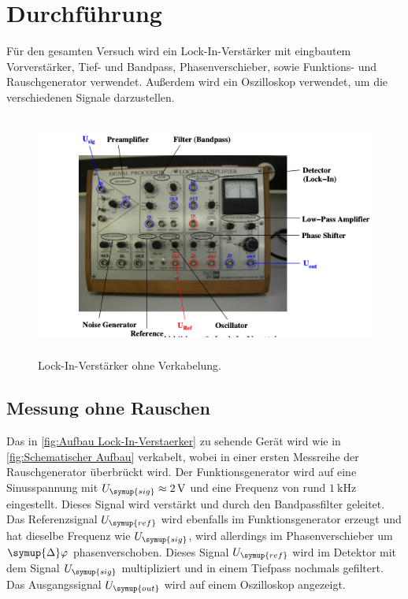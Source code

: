 \section{Durchführung}
\label{sec:Durchfuehrung}
Für den gesamten Versuch wird ein Lock-In-Verstärker mit eingbautem Vorverstärker, Tief- und Bandpass, Phasenverschieber,
sowie Funktions- und Rauschgenerator verwendet. Außerdem wird ein Oszilloskop verwendet, um die verschiedenen Signale darzustellen.

\begin{figure} [H]
    \centering
    \includegraphics[height=8cm]{content/Bilder/Aufbau_Bild.png}
    \caption{Lock-In-Verstärker ohne Verkabelung.\cite{v303}}
    \label{fig:Aufbau Lock-In-Verstaerker}
\end{figure}

\subsection{Messung ohne Rauschen}
\label{sec:Messung ohne Rauschen}
Das in \autoref{fig:Aufbau Lock-In-Verstaerker} zu sehende Gerät wird wie in \autoref{fig:Schematischer Aufbau} verkabelt, 
wobei in einer ersten Messreihe der Rauschgenerator überbrückt wird. Der Funktionsgenerator wird auf eine Sinusspannung mit 
$U_{\symup{sig}}\approx\qty{2}{\volt}$ und eine Frequenz von rund $\qty{1}{\kilo\hertz}$ eingestellt. Dieses Signal wird 
verstärkt und durch den Bandpassfilter geleitet. Das Referenzsignal $U_{\symup{ref}}$ wird ebenfalls im Funktionsgenerator 
erzeugt und hat dieselbe Frequenz wie $U_{\symup{sig}}$, wird allerdings im Phasenverschieber um $\symup{\Delta}\varphi$ 
phasenverschoben. Dieses Signal $U_{\symup{ref}}$ wird im Detektor mit dem Signal $U_{\symup{sig}}$ multipliziert und in einem
Tiefpass nochmals gefiltert. Das Ausgangssignal $U_{\symup{out}}$ wird auf einem Oszilloskop angezeigt.

